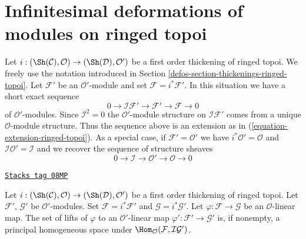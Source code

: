 \section{Infinitesimal deformations of modules on ringed topoi}
\label{defos-section-deformation-modules-ringed-topoi}
Let $i : (\Sh(\mathcal{C}), \mathcal{O}) \to (\Sh(\mathcal{D}), \mathcal{O}')$
be a first order thickening of ringed topoi. We freely use the notation
introduced in Section \ref{defos-section-thickenings-ringed-topoi}.
Let $\mathcal{F}'$ be an $\mathcal{O}'$-module
and set $\mathcal{F} = i^*\mathcal{F}'$.
In this situation we have a short exact sequence
$$
0 \to \mathcal{I}\mathcal{F}' \to \mathcal{F}' \to \mathcal{F} \to 0
$$
of $\mathcal{O}'$-modules. Since $\mathcal{I}^2 = 0$ the
$\mathcal{O}'$-module structure on $\mathcal{I}\mathcal{F}'$
comes from a unique $\mathcal{O}$-module structure.
Thus the sequence above is an extension as in
(\ref{equation-extension-ringed-topoi}).
As a special case, if $\mathcal{F}' = \mathcal{O}'$ we have
$i^*\mathcal{O}' = \mathcal{O}$ and
$\mathcal{I}\mathcal{O}' = \mathcal{I}$ and we recover the
sequence of structure sheaves
$$
0 \to \mathcal{I} \to \mathcal{O}' \to \mathcal{O} \to 0
$$

\begin{lemma}
\label{defos-lemma-inf-map-special-ringed-topoi}
\href{https://stacks.math.columbia.edu/tag/08MP}{\texttt{Stacks tag 08MP}}

Let $i : (\Sh(\mathcal{C}), \mathcal{O}) \to (\Sh(\mathcal{D}), \mathcal{O}')$
be a first order thickening of ringed topoi.
Let $\mathcal{F}'$, $\mathcal{G}'$ be $\mathcal{O}'$-modules.
Set $\mathcal{F} = i^*\mathcal{F}'$ and $\mathcal{G} = i^*\mathcal{G}'$.
Let $\varphi : \mathcal{F} \to \mathcal{G}$ be an $\mathcal{O}$-linear map.
The set of lifts of $\varphi$ to an $\mathcal{O}'$-linear map
$\varphi' : \mathcal{F}' \to \mathcal{G}'$ is, if nonempty, a principal
homogeneous space under
$\Hom_\mathcal{O}(\mathcal{F}, \mathcal{I}\mathcal{G}')$.
\end{lemma}


